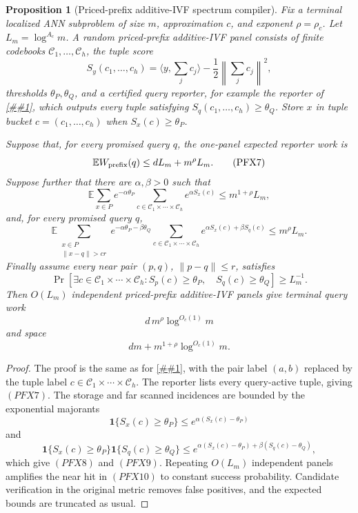 \documentclass[10pt]{article}
\newcommand{\cref}[1]{\ref{##1}}
\newtheorem{proposition}[theorem]{Proposition}
\theoremstyle{definition}
\newcommand{\E}{\mathbb{E}}
\newcommand{\ip}[2]{\langle #1,#2\rangle}
\begin{document}
\begin{proposition}[Priced-prefix additive-IVF spectrum compiler]
   \label{prop:priced-prefix-additive-ivf-compiler}
   Fix a terminal localized ANN subproblem of size \(m\), approximation \(c\),
   and exponent \(\rho=\rho_c\).  Let \(L_m=\log^{A_c}m\).  A random
   priced-prefix additive-IVF panel consists of finite codebooks
   \(\mathcal C_1,\ldots,\mathcal C_h\), the tuple score
   \[
      S_y(c_1,\ldots,c_h)
      =
      \ip{y}{\sum_jc_j}-\frac12\left\|\sum_jc_j\right\|^2,
      \tag{PFX6}
   \]
   thresholds \(\theta_P,\theta_Q\), and a certified query reporter, for
   example the reporter of
   \cref{lem:priced-prefix-additive-ivf-reporter}, which outputs every tuple
   satisfying \(S_q(c_1,\ldots,c_h)\ge\theta_Q\).  Store \(x\) in tuple bucket
   \(c=(c_1,\ldots,c_h)\) when \(S_x(c)\ge\theta_P\).

   Suppose that, for every promised query \(q\), the one-panel expected
   reporter work is
   \[
      \E W_{\rm prefix}(q)\le dL_m+m^\rho L_m .
      \tag{PFX7}
   \]
   Suppose further that there are \(\alpha,\beta>0\) such that
   \[
      \E
      \sum_{x\in P}
      e^{-\alpha\theta_P}
      \sum_{c\in\mathcal C_1\times\cdots\times\mathcal C_h}
      e^{\alpha S_x(c)}
      \le
      m^{1+\rho}L_m,
      \tag{PFX8}
   \]
   and, for every promised query \(q\),
   \[
      \E
      \sum_{\substack{x\in P\\ \|x-q\|>cr}}
      e^{-\alpha\theta_P-\beta\theta_Q}
      \sum_{c\in\mathcal C_1\times\cdots\times\mathcal C_h}
      e^{\alpha S_x(c)+\beta S_q(c)}
      \le
      m^\rho L_m .
      \tag{PFX9}
   \]
   Finally assume every near pair \((p,q)\), \(\|p-q\|\le r\), satisfies
   \[
      \Pr\!\left[
      \exists c\in\mathcal C_1\times\cdots\times\mathcal C_h:
      S_p(c)\ge\theta_P,\quad S_q(c)\ge\theta_Q
      \right]
      \ge L_m^{-1}.
      \tag{PFX10}
   \]
   Then \(O(L_m)\) independent priced-prefix additive-IVF panels give terminal
   query work
   \[
      d\,m^\rho\log^{O_c(1)}m
   \]
   and space
   \[
      dm+m^{1+\rho}\log^{O_c(1)}m .
   \]
\end{proposition}

\begin{proof}
   The proof is the same as for
   \cref{prop:priced-pair-additive-ivf-compiler}, with the pair label
   \((a,b)\) replaced by the tuple label
   \(c\in\mathcal C_1\times\cdots\times\mathcal C_h\).  The reporter lists
   every query-active tuple, giving \((PFX7)\).  The storage and far scanned
   incidences are bounded by the exponential majorants
   \[
      \mathbf 1\{S_x(c)\ge\theta_P\}
      \le e^{\alpha(S_x(c)-\theta_P)}
   \]
   and
   \[
      \mathbf 1\{S_x(c)\ge\theta_P\}
      \mathbf 1\{S_q(c)\ge\theta_Q\}
      \le
      e^{\alpha(S_x(c)-\theta_P)+\beta(S_q(c)-\theta_Q)} ,
   \]
   which give \((PFX8)\) and \((PFX9)\).  Repeating \(O(L_m)\) independent
   panels amplifies the near hit in \((PFX10)\) to constant success
   probability.  Candidate verification in the original metric removes false
   positives, and the expected bounds are truncated as usual.
\end{proof}
\end{document}
